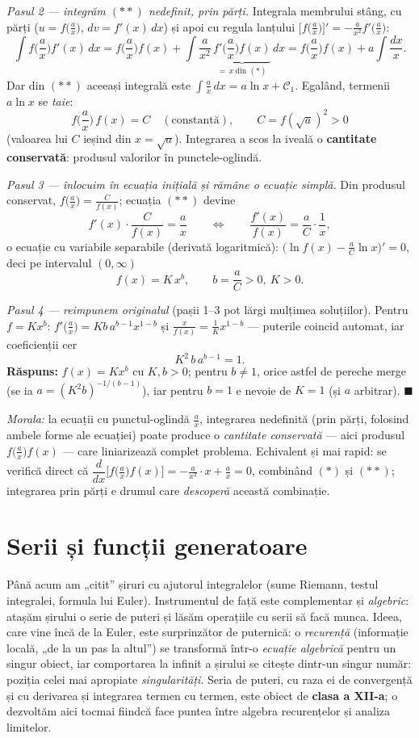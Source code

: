 \emph{Pasul 2 --- integrăm $(**)$ nedefinit, prin părți.} Integrala membrului stâng, cu părți ($u=f\big(\frac ax\big)$, $dv=f'(x)\,dx$) și apoi cu regula lanțului $\big[f\big(\frac ax\big)\big]'=-\frac{a}{x^2}f'\big(\frac ax\big)$:
\[
\int f\Big(\frac ax\Big)f'(x)\,dx
= f\Big(\frac ax\Big)f(x)+\int \frac{a}{x^2}\,\underbrace{f'\Big(\frac ax\Big)f(x)}_{=\,x\ \text{din }(*)}\,dx
= f\Big(\frac ax\Big)f(x)+a\int\frac{dx}{x}.
\]
Dar din $(**)$ aceeași integrală este $\int\frac ax\,dx=a\ln x+\mathcal C_1$. Egalând, termenii $a\ln x$ se \emph{taie}:
\[
f\Big(\frac ax\Big)\,f(x)=C\quad(\text{constantă}),\qquad C=f(\sqrt a)^2>0
\]
(valoarea lui $C$ ieșind din $x=\sqrt a$). Integrarea a scos la iveală o \textbf{cantitate conservată}: produsul valorilor în punctele-oglindă.

\emph{Pasul 3 --- înlocuim în ecuația inițială și rămâne o ecuație simplă.} Din produsul conservat, $f\big(\frac ax\big)=\frac{C}{f(x)}$; ecuația $(**)$ devine
\[
f'(x)\cdot\frac{C}{f(x)}=\frac ax
\qquad\Longleftrightarrow\qquad
\frac{f'(x)}{f(x)}=\frac{a}{C}\cdot\frac1x,
\]
o ecuație cu variabile separabile (derivată logaritmică): $\big(\ln f(x)-\frac aC\ln x\big)'=0$, deci pe intervalul $(0,\infty)$
\[
f(x)=K\,x^{b},\qquad b=\frac aC>0,\ K>0.
\]

\emph{Pasul 4 --- reimpunem originalul} (pașii 1--3 pot lărgi mulțimea soluțiilor). Pentru $f=Kx^b$: $f'\big(\frac ax\big)=Kb\,a^{b-1}x^{1-b}$ și $\frac{x}{f(x)}=\frac1K x^{1-b}$ --- puterile coincid automat, iar coeficienții cer
\[
K^2\,b\,a^{b-1}=1.
\]
\textbf{Răspuns:} $f(x)=K x^{b}$ cu $K,b>0$; pentru $b\neq1$, orice astfel de pereche merge (se ia $a=(K^2b)^{-1/(b-1)}$), iar pentru $b=1$ e nevoie de $K=1$ (și $a$ arbitrar). $\blacksquare$

\emph{Morala:} la ecuații cu punctul-oglindă $\frac ax$, integrarea nedefinită (prin părți, folosind ambele forme ale ecuației) poate produce o \emph{cantitate conservată} --- aici produsul $f\big(\frac ax\big)f(x)$ --- care liniarizează complet problema. Echivalent și mai rapid: se verifică direct că $\dfrac{d}{dx}\Big[f\big(\tfrac ax\big)f(x)\Big]=-\frac{a}{x^2}\cdot x+\frac ax=0$, combinând $(*)$ și $(**)$; integrarea prin părți e drumul care \emph{descoperă} această combinație.

\section{Serii și funcții generatoare}

Până acum am „citit'' șiruri cu ajutorul integralelor (sume Riemann, testul integralei, formula lui Euler). Instrumentul de față este complementar și \emph{algebric}: atașăm șirului o serie de puteri și lăsăm operațiile cu serii să facă munca. Ideea, care vine încă de la Euler, este surprinzător de puternică: o \emph{recurență} (informație locală, „de la un pas la altul'') se transformă într-o \emph{ecuație algebrică} pentru un singur obiect, iar comportarea la infinit a șirului se citește dintr-un singur număr: poziția celei mai apropiate \emph{singularități}. Seria de puteri, cu raza ei de convergență și cu derivarea și integrarea termen cu termen, este obiect de \textbf{clasa a XII-a}; o dezvoltăm aici tocmai fiindcă face puntea între algebra recurențelor și analiza limitelor.


